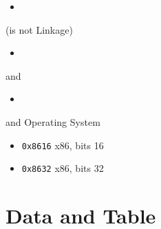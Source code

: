 \begin{itemize}
	\item%
\end{itemize}

 (is not Linkage)
\begin{itemize}
	\item%
\end{itemize}

 and 
\begin{itemize}
	\item%
\end{itemize}

 and Operating System
\begin{itemize}
	\item \verb|0x8616| x86, bits 16
	\item \verb|0x8632| x86, bits 32
\end{itemize}

\section{Data and Table}

